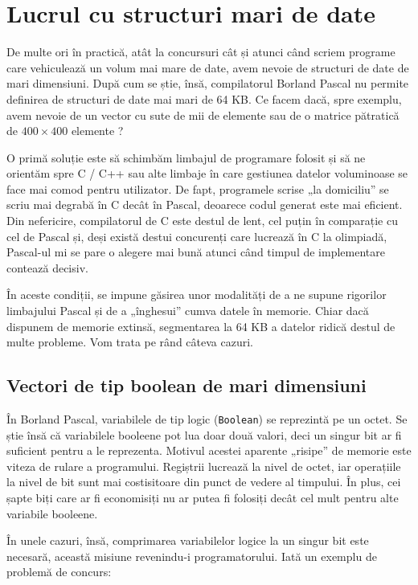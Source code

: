 \chapter{Lucrul cu structuri mari de date}

De multe ori în practică, atât la concursuri cât și atunci când scriem
programe care vehiculează un volum mai mare de date, avem nevoie de structuri
de date de mari dimensiuni. După cum se știe, însă, compilatorul Borland
Pascal nu permite definirea de structuri de date mai mari de 64 KB. Ce facem
dacă, spre exemplu, avem nevoie de un vector cu sute de mii de elemente sau de
o matrice pătratică de $400 \times 400$ elemente ?

O primă soluție este să schimbăm limbajul de programare folosit și să ne
orientăm spre C / C++ sau alte limbaje în care gestiunea datelor voluminoase
se face mai comod pentru utilizator. De fapt, programele scrise „la domiciliu”
se scriu mai degrabă în C decât în Pascal, deoarece codul generat este mai
eficient. Din nefericire, compilatorul de C este destul de lent, cel puțin în
comparație cu cel de Pascal și, deși există destui concurenți care lucrează în
C la olimpiadă, Pascal-ul mi se pare o alegere mai bună atunci când timpul de
implementare contează decisiv.

În aceste condiții, se impune găsirea unor modalități de a ne supune rigorilor
limbajului Pascal și de a „înghesui” cumva datele în memorie. Chiar dacă
dispunem de memorie extinsă, segmentarea la 64 KB a datelor ridică destul de
multe probleme. Vom trata pe rând câteva cazuri.

\section{Vectori de tip boolean de mari dimensiuni}

În Borland Pascal, variabilele de tip logic ({\tt Boolean}) se reprezintă pe
un octet. Se știe însă că variabilele booleene pot lua doar două valori, deci
un singur bit ar fi suficient pentru a le reprezenta. Motivul acestei aparente
„risipe” de memorie este viteza de rulare a programului. Regiștrii lucrează la
nivel de octet, iar operațiile la nivel de bit sunt mai costisitoare din punct
de vedere al timpului. În plus, cei șapte biți care ar fi economisiți nu ar
putea fi folosiți decât cel mult pentru alte variabile booleene.

În unele cazuri, însă, comprimarea variabilelor logice la un singur bit este
necesară, această misiune revenindu-i programatorului. Iată un exemplu de
problemă de concurs:

